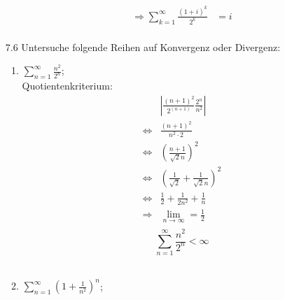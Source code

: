 \documentclass{HM}
\begin{document}
\begin{enumerate}
\begin{enumerate}
\begin{align*}
	\\
	\Rightarrow \sum\limits_{k=1}^\infty\frac{(1+i)^k}{2^k} &= i\\
\end{align*}
\end{enumerate}
\item[7.6] Untersuche folgende Reihen auf Konvergenz oder Divergenz:
\begin{enumerate}
\item $\sum\limits_{n=1}^\infty\frac{n^2}{2^n}$;\\
Quotientenkriterium:
\begin{align*}
	&\left|\frac{(n+1)^2}{2^(n+1)}\frac{2^n}{n^2}\right|\\
	\Leftrightarrow &\frac{(n+1)^2}{n^2\cdot 2}\\
	\Leftrightarrow &\left(\frac{n+1}{\sqrt{2}n}\right)^2\\
	\Leftrightarrow &\left(\frac{1}{\sqrt{2}}+\frac{1}{\sqrt{2}n}\right)^2\\
	\Leftrightarrow &\frac{1}{2} + \frac{1}{2n^2} + \frac{1}{n}\\
	\Rightarrow &\lim_{n\to\infty} = \frac{1}{2}\\
\end{align*}
$$\sum\limits_{n=1}^\infty\frac{n^2}{2^n} < \infty$$\\

\item $\sum\limits_{n=1}^\infty(1+\frac{1}{n^2})^n$;\\


\end{enumerate}
\end{enumerate}
\end{document}

